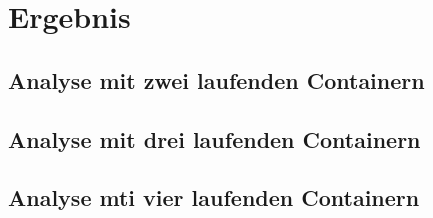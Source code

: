 \section{Ergebnis}\label{Ergebnis}


\subsection{Analyse mit zwei laufenden Containern}




\subsection{Analyse mit drei laufenden Containern}

\subsection{Analyse mti vier laufenden Containern}
